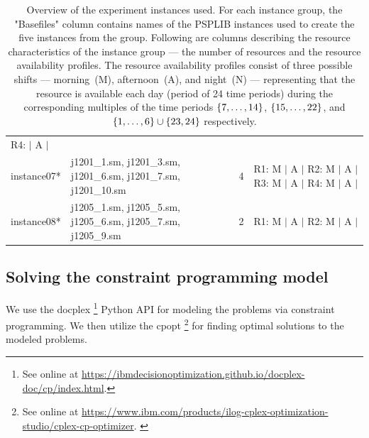 \begin{table}[p]
\begin{tabularx}{0.95\textwidth}{lXcX}
                      R4: \phantom{M} $|$ A $|$
                    \\
                    \cmidrule[0.01em](lr){1-4}
        instance07* & j1201\_1.sm, j1201\_3.sm, j1201\_6.sm, j1201\_7.sm, j1201\_10.sm
                    & 4 
                    & R1: M $|$ A $|$ \newline
                      R2: M $|$ A $|$ \newline
                      R3: M $|$ A $|$ \newline
                      R4: M $|$ A $|$
                    \\
                    \cmidrule[0.01em](lr){1-4}
        instance08* & j1205\_1.sm, j1205\_5.sm, j1205\_6.sm, j1205\_7.sm, j1205\_9.sm
                    & 2 
                    & R1: M $|$ A $|$ \newline
                      R2: M $|$ A $|$
                    \\
        \bottomrule
    \end{tabularx}
    \caption{
        Overview of the experiment instances used.
        For each instance group,
        the "Basefiles" column contains names of the PSPLIB instances
        used to create the five instances from the group.
        Following are columns describing the resource characteristics of the instance group ---
        the number of resources and the resource availability profiles.
        The resource availability profiles consist of three possible shifts ---
        morning~(M), afternoon~(A), and night~(N) ---
        representing that the resource is available each day (period of 24 time periods)
        during the corresponding multiples of the time periods
        $\{{7}, \dots, {14}\}$, $\{{15}, \dots, {22}\}$, and $\{{1}, \dots, {6}\} \cup \{23, 24\}$ respectively.
        }
    \label{tab:instances}
\end{table}

\subsection{Solving the constraint programming model} \label{subsec:numerical-experiments/setup/solving-cp-model}

We use the \ac{docplex}%
\footnote{See online at \url{https://ibmdecisionoptimization.github.io/docplex-doc/cp/index.html}.}
Python API for modeling the problems via constraint programming.
We then utilize the \ac{cpopt}%
\footnote{See online at \url{https://www.ibm.com/products/ilog-cplex-optimization-studio/cplex-cp-optimizer}. \citep{WEB_IBM_CPLEX}}
for finding optimal solutions to the modeled problems.

